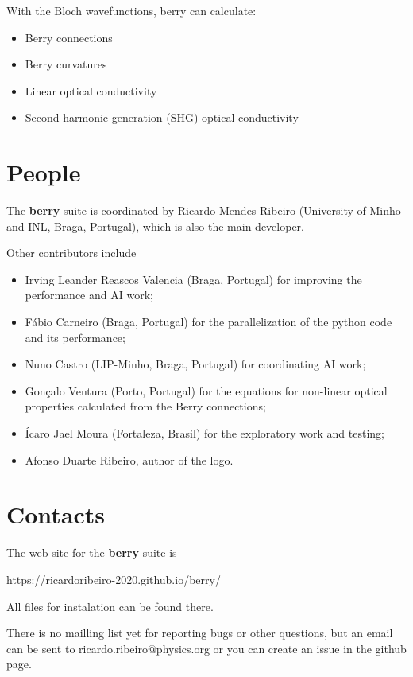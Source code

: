 \documentclass[a4paper,12pt]{report}
\begin{document}
With the Bloch wavefunctions, berry can calculate:
\begin{itemize}
  \item Berry connections
  \item Berry curvatures
  \item Linear optical conductivity
  \item Second harmonic generation (SHG) optical conductivity
\end{itemize}









\section{People}

The \textbf{berry} suite is coordinated by Ricardo Mendes Ribeiro (University of Minho and INL, Braga, Portugal),
which is also the main developer.\medskip

Other contributors include
\begin{itemize}
 \item Irving Leander Reascos Valencia (Braga, Portugal) for improving the performance
 and AI work;
 \item Fábio Carneiro (Braga, Portugal) for the parallelization of the python code
 and its performance;
 \item Nuno Castro (LIP-Minho, Braga, Portugal) for coordinating AI work;
 \item Gonçalo Ventura (Porto, Portugal) for the equations for non-linear optical properties
 calculated from the Berry connections;
 \item Ícaro Jael Moura (Fortaleza, Brasil) for the exploratory work and testing;
 \item Afonso Duarte Ribeiro, author of the logo.
\end{itemize}




\section{Contacts}

The web site for the \textbf{berry} suite is\medskip

https://ricardoribeiro-2020.github.io/berry/\medskip

All files for instalation can be found there.

There is no mailling list yet for reporting bugs or other questions, but an email can be sent to
ricardo.ribeiro@physics.org or you can create an issue in the github page.
\end{document}
